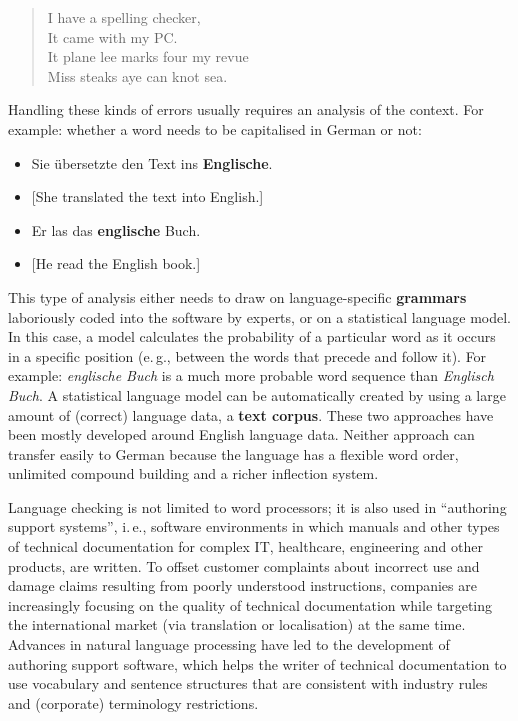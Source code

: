 \documentclass[]{../../metanetpaper}
\begin{document}
\begin{multicols}{2}
\begin{quote}
  I have a spelling checker,\\
  It came with my PC.\\
  It plane lee marks four my revue\\
  Miss steaks aye can knot sea.
\end{quote}

Handling these kinds of errors usually requires an analysis of the context. For example: whether a word needs to be capitalised in German or not:

\begin{itemize}
\item Sie übersetzte den Text ins \textbf{Englische}.
\item {[}She translated the text into English.{]} 
\item Er las das \textbf{englische} Buch.
\item {[}He read the English book.{]}
\end{itemize}

This type of analysis either needs to draw on language-specific \textbf{grammars} laboriously coded into the software by experts, or on a statistical language model. In this case, a model calculates the probability of a particular word as it occurs in a specific position (e.\,g., between the words that precede and follow it). For example: \textit{englische Buch} is a much more probable word sequence than \textit{Englisch Buch}. A statistical language model can be automatically created by using a large amount of (correct) language data, a \textbf{text corpus}. These two approaches have been mostly developed around English language data. Neither approach can transfer easily to German because the language has a flexible word order, unlimited compound building and a richer inflection system.

Language checking is not limited to word processors; it is also used in “authoring support systems”, i.\,e., software environments in which manuals and other types of technical documentation for complex IT, healthcare, engineering and other products, are written. To offset customer complaints about incorrect use and damage claims resulting from poorly understood instructions, companies are increasingly focusing on the quality of technical documentation while targeting the international market (via translation or localisation) at the same time. Advances in natural language processing have led to the development of authoring support software, which helps the writer of technical documentation to use vocabulary and sentence structures that are consistent with industry rules and (corporate) terminology restrictions.


\end{multicols}
\end{document}
